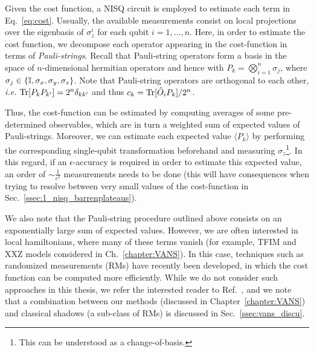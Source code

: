 \vspace{1cm}

Given the cost function, a NISQ circuit is employed to estimate each term in Eq.~\eqref{eq:cost}. Ussually, the available measurements consist on local projections over the eigenbasis of $\sigma^{i}_z$ for each qubit $i=1,...,n$. Here, in order to estimate the cost function, we decompose each operator appearing in the cost-function in terms of \textit{Pauli-strings}. Recall that Pauli-string operators form a basis in the space of $n$-dimensional hermitian operators and hence
with $P_k = \bigotimes_{i=1}^n\mathbb{\sigma}_j$, where $\mathbb{\sigma}_j \in \lbrace \mathbb{I}, \sigma_x, \sigma_y, \sigma_z\rbrace$. Note that Pauli-string operators are orthogonal to each other, \textit{i.e.} $\text{Tr}[P_k P_{k'}] = 2^n \delta_{k k'}$ and thus $c_k = \text{Tr}[\hat{O}_i P_k]/2^n$.

Thus, the cost-function can be estimated by computing averages of some pre-determined observables, which are in turn a weighted sum of expected values of Pauli-strings. Moreover, we can estimate each expected value $\langle P_k\rangle$ by performing the corresponding single-qubit transformation beforehand and measuring $\sigma_z$\footnote{This can be understood as a change-of-basis.}. In this regard, if an $\epsilon$-accuracy is required in order to estimate this expected value, an order of $\sim \frac{1}{\epsilon^2}$ measurements needs to be done (this will have consequences when trying to resolve between very small values of the cost-function in Sec.~\ref{ssec:1_nisq_barrenplateaus}).

We also note that the Pauli-string procedure outlined above consists on an exponentially large sum of expected values. However, we are often interested in local hamiltonians, where many of these terms vanish (for example, TFIM and XXZ models considered in Ch.~\ref{chapter:VANS}). In this case, techniques such as randomized measurements (RMs) have recently been developed, in which the cost function can be computed more efficiently. While we do not consider such approaches in this thesis, we refer the interested reader to Ref.~\cite{elben2022randomized}, and we note that a combination between our methods (discussed in Chapter~\ref{chapter:VANS}) and classical shadows (a sub-class of RMs) is discussed in Sec.~\ref{ssec:vans_discu}.

\vspace{1cm}

